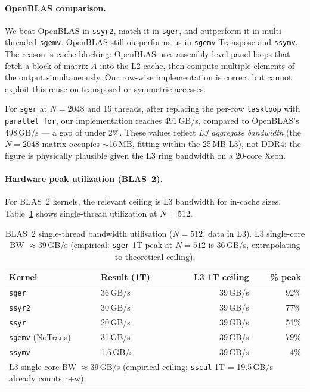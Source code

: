 \documentclass[11pt,a4paper]{article}
\begin{document}
\paragraph{OpenBLAS comparison.}
We beat OpenBLAS in \texttt{ssyr2}, match it in \texttt{sger}, and outperform it in multi-threaded \texttt{sgemv}. OpenBLAS still outperforms us in \texttt{sgemv} Transpose and \texttt{ssymv}. The reason is cache-blocking: OpenBLAS uses assembly-level panel loops that fetch a block of matrix $A$ into the L2 cache, then compute multiple elements of the output simultaneously. Our row-wise implementation is correct but cannot exploit this reuse on transposed or symmetric accesses.

For \texttt{sger} at $N=2048$ and 16 threads, after replacing the per-row \texttt{taskloop} with \texttt{parallel for}, our implementation reaches 491\,GB/s, compared to OpenBLAS's 498\,GB/s — a gap of under 2\%. These values reflect \emph{L3 aggregate bandwidth} (the $N=2048$ matrix occupies $\sim$16\,MB, fitting within the 25\,MB L3), not DDR4; the figure is physically plausible given the L3 ring bandwidth on a 20-core Xeon.

\paragraph{Hardware peak utilization (BLAS~2).}
For BLAS~2 kernels, the relevant ceiling is L3 bandwidth for in-cache sizes. Table~\ref{tab:blas2_peak} shows single-thread utilization at $N=512$.

\begin{table}[h]
\centering
\caption{BLAS~2 single-thread bandwidth utilisation ($N=512$, data in L3).
  L3 single-core BW $\approx 39$\,GB/s (empirical: \texttt{sger} 1T peak at $N=512$ is 36\,GB/s, extrapolating to theoretical ceiling).}
\label{tab:blas2_peak}
\small
\begin{tabular}{llrr}
\toprule
Kernel & Result (1T) & L3 1T ceiling & \% peak \\
\midrule
\texttt{sger}   & 36\,GB/s  & 39\,GB/s & 92\% \\
\texttt{ssyr2}  & 30\,GB/s  & 39\,GB/s & 77\% \\
\texttt{ssyr}   & 20\,GB/s  & 39\,GB/s & 51\% \\
\texttt{sgemv}  (NoTrans) & 31\,GB/s  & 39\,GB/s & 79\% \\
\texttt{ssymv}  & 1.6\,GB/s & 39\,GB/s & 4\% \\
\bottomrule
\multicolumn{4}{l}{L3 single-core BW $\approx 39$\,GB/s (empirical ceiling; \texttt{sscal} 1T = 19.5\,GB/s already counts r+w).}
\end{tabular}
\end{table}
\end{document}
